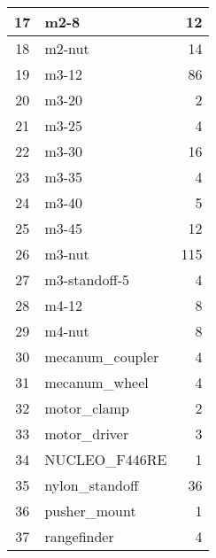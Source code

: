 \begin{longtable}{clr}
	17       & m2-8                                    & 12                       \\ \hline
	18       & m2-nut                                  & 14                       \\ \hline
	19       & m3-12                                   & 86                       \\ \hline
	20       & m3-20                                   & 2                        \\ \hline
	21       & m3-25                                   & 4                        \\ \hline
	22       & m3-30                                   & 16                       \\ \hline
	23       & m3-35                                   & 4                        \\ \hline
	24       & m3-40                                   & 5                        \\ \hline
	25       & m3-45                                   & 12                       \\ \hline
	26       & m3-nut                                  & 115                      \\ \hline
	27       & m3-standoff-5                           & 4                        \\ \hline
	28       & m4-12                                   & 8                        \\ \hline
	29       & m4-nut                                  & 8                        \\ \hline
	30       & mecanum\_coupler                        & 4                        \\ \hline
	31       & mecanum\_wheel                          & 4                        \\ \hline
	32       & motor\_clamp                            & 2                        \\ \hline
	33       & motor\_driver                           & 3                        \\ \hline
	34       & NUCLEO\_F446RE                          & 1                        \\ \hline
	35       & nylon\_standoff                         & 36                       \\ \hline
	36       & pusher\_mount                           & 1                        \\ \hline
	37       & rangefinder                             & 4                        \\ \hline

\end{longtable}
